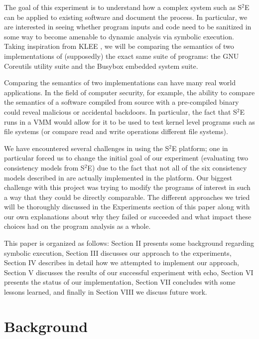 \documentclass[conference]{IEEEtran}
\begin{document}
The goal of this experiment is to understand how a complex system such
as S$^2$E can be applied to existing software and document the process.
In particular, we are interested in seeing whether program inputs and code
need to be sanitized in some way to become amenable to dynamic analysis
via symbolic execution. Taking inspiration from KLEE \cite{klee}, we will be
comparing the semantics of two implementations of (supposedly) the exact
same suite of programs: the GNU Coreutils utility suite and the Busybox
embedded system suite.

Comparing the semantics of two implementations can have many real world
applications. In the field of computer security, for example, the ability to compare
the semantics of a software compiled from source with a pre-compiled binary
could reveal malicious or accidental backdoors. In particular, the fact that S$^2$E
runs in a VMM would allow for it to be used to test kernel level programs such as
file systems (or compare read and write operations different file systems).

We have encountered several challenges in using the S$^2$E platform; one
in particular forced us to change the initial goal of our experiment (evaluating
two consistency models from S$^2$E) due to the fact that not all of the six
consistency models described in \cite{s2e} are actually implemented in the
platform. Our biggest challenge with this project was trying to modify the programs
of interest in such a way that they could be directly comparable. The different
approaches we tried will be thoroughly discussed in the Experiments section of this
paper along with our own explanations about why they failed or succeeded and
what impact these choices had on the program analysis as a whole.

This paper is organized as follows: Section II presents some background regarding
symbolic execution, Section III discusses our approach to the experiments, Section IV 
describes in detail how we attempted to implement our approach, Section V discusses 
the results of our successful experiment with echo, Section VI presents the status 
of our implementation, Section VII concludes with some lessons learned, and finally in
Section VIII we discuss future work. 


\section{Background}
\end{document}

